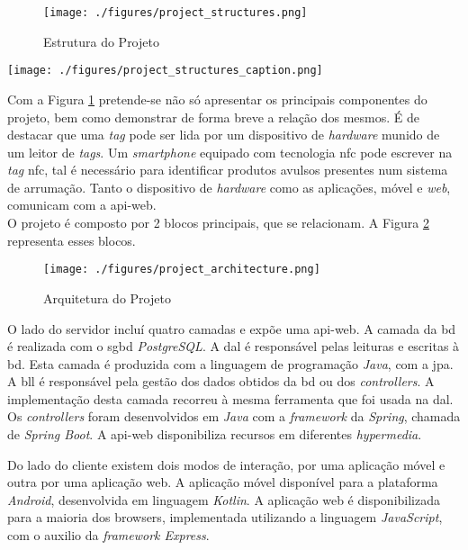 \begin{figure}[H]
	\centering
	\texttt{[image: ./figures/project\_structures.png]}
	\caption{Estrutura do Projeto}
	\label{project-structure}
\end{figure}

\begin{center}
	\texttt{[image: ./figures/project\_structures\_caption.png]}
\end{center}

Com a Figura \ref{project-structure} pretende-se não só apresentar os principais componentes do projeto, bem como demonstrar de forma breve a relação dos mesmos. É de destacar que uma \textit{tag} pode ser lida por um dispositivo de \textit{hardware} munido de um leitor de \textit{tags}. Um \textit{smartphone} equipado com tecnologia \acrshort{nfc} pode escrever na \textit{tag} \acrshort{nfc}, tal é necessário para identificar produtos avulsos presentes num sistema de arrumação. Tanto o dispositivo de \textit{hardware} como as aplicações, móvel e \textit{web}, comunicam com a \gls{api-web}.\\

O projeto é composto por 2 blocos principais, que se relacionam. A Figura \ref{project-architecture} representa esses blocos. 

\begin{figure}[H]
	\centering
	\texttt{[image: ./figures/project\_architecture.png]}
	\caption{Arquitetura do Projeto}
	\label{project-architecture}
\end{figure}

O lado do servidor incluí quatro camadas e expõe uma \gls{api-web}. A camada da \acrfull{bd} é realizada com o \acrfull{sgbd} \textit{PostgreSQL}. A \acrfull{dal} é responsável pelas leituras e escritas à \acrshort{bd}. Esta camada é produzida com a linguagem de programação \textit{Java}, com a \acrfull{jpa}. A \acrfull{bll} é responsável pela gestão dos dados obtidos da \acrshort{bd} ou dos \textit{controllers}. A implementação desta camada recorreu à mesma ferramenta que foi usada na \acrshort{dal}. Os \textit{controllers} foram desenvolvidos em \textit{Java} com a \textit{framework} da \textit{Spring}, chamada de \textit{Spring Boot}. A \gls{api-web} disponibiliza recursos em diferentes \textit{hypermedia}.

Do lado do cliente existem dois modos de interação, por uma aplicação móvel e outra por uma aplicação web. A aplicação móvel disponível para a plataforma \textit{Android}, desenvolvida em linguagem \textit{Kotlin}. A aplicação web é disponibilizada para a maioria dos browsers, implementada utilizando a linguagem \textit{JavaScript}, com o auxilio da \textit{framework Express}.


